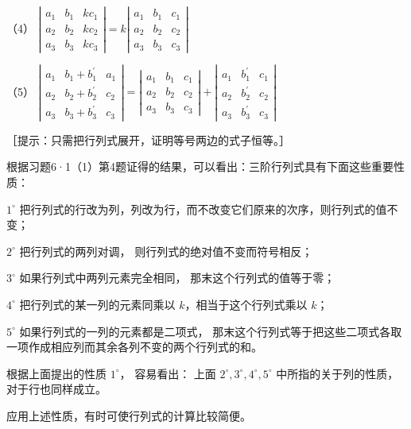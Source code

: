 （4）
\(\left| \begin{array}{lll}a_{1} & b_{1} & kc_{1}\\ a_{2} & b_{2} & kc_{2}\\ a_{3} & b_{3} & kc_{3} \end{array} \right| = k\left| \begin{array}{lll}a_{1} & b_{1} & c_{1}\\ a_{2} & b_{2} & c_{2}\\ a_{3} & b_{3} & c_{3} \end{array} \right|\)

（5）
\(\left| \begin{array}{lll}a_{1} & b_{1} + b_{1}^{\prime} & a_{1}\\ a_{2} & b_{2} + b_{2}^{\prime} & c_{2}\\ a_{3} & b_{3} + b_{3}^{\prime} & c_{3} \end{array} \right| = \left| \begin{array}{lll}a_{1} & b_{1} & c_{1}\\ a_{2} & b_{2} & c_{2}\\ a_{3} & b_{3} & c_{3} \end{array} \right| + \left| \begin{array}{lll}a_{1} & b_{1}^{\prime} & c_{1}\\ a_{2} & b_{2}^{\prime} & c_{2}\\ a_{3} & b_{3}^{\prime} & c_{3} \end{array} \right|\)

［提示：只需把行列式展开，证明等号两边的式子恒等。］

根据习题6·1（1）第4题证得的结果，可以看出：三阶行列式具有下面这些重要性质：

\(1^{\circ}\)
把行列式的行改为列，列改为行，而不改变它们原来的次序，则行列式的值不变；

\(2^{\circ}\) 把行列式的两列对调， 则行列式的绝对值不变而符号相反；

\(3^{\circ}\) 如果行列式中两列元素完全相同， 那末这个行列式的值等于零；

\(4^{\circ}\) 把行列式的某一列的元素同乘以 \(k\)，相当于这个行列式乘以
\(k\)；

\(5^{\circ}\) 如果行列式的一列的元素都是二项式，
那末这个行列式等于把这些二项式各取一项作成相应列而其余各列不变的两个行列式的和。

根据上面提出的性质 \(1^{\circ}\)， 容易看出： 上面
\(2^{\circ}, 3^{\circ}, 4^{\circ}, 5^{\circ}\) 中所指的关于列的性质，
对于行也同样成立。

应用上述性质，有时可使行列式的计算比较简便。


